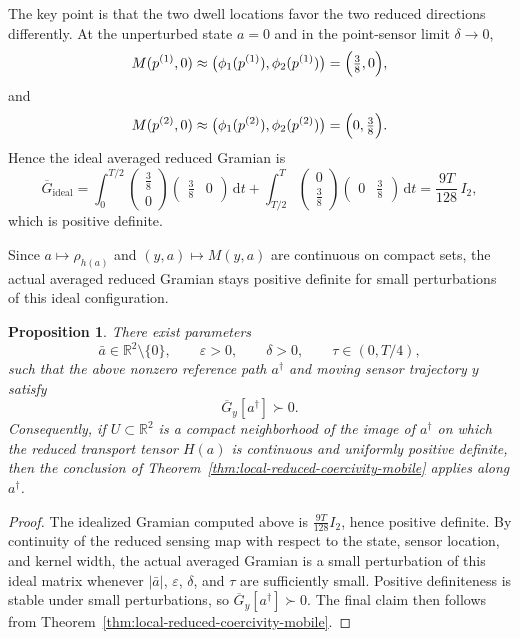 \documentclass{article}
\newtheorem{proposition}[theorem]{Proposition}
\theoremstyle{definition}
\renewcommand{\d}{\mathrm{d}}
\begin{document}
The key point is that the two dwell locations favor the two reduced directions differently.
At the unperturbed state \(a=0\) and in the point-sensor limit \(\delta\to 0\),
\[
    M(p^{(1)},0)\approx
    \bigl(\phi_1(p^{(1)}),\phi_2(p^{(1)})\bigr)
    =
    \Bigl(\tfrac38,0\Bigr),
\]
and
\[
    M(p^{(2)},0)\approx
    \bigl(\phi_1(p^{(2)}),\phi_2(p^{(2)})\bigr)
    =
    \Bigl(0,\tfrac38\Bigr).
\]
Hence the ideal averaged reduced Gramian is
\[
    \overline G_{\mathrm{ideal}}
    =
    \int_0^{T/2}
    \begin{pmatrix}\tfrac38\\[1mm]0\end{pmatrix}
    \begin{pmatrix}\tfrac38 & 0\end{pmatrix}\,\d t
    +
    \int_{T/2}^{T}
    \begin{pmatrix}0\\[1mm]\tfrac38\end{pmatrix}
    \begin{pmatrix}0 & \tfrac38\end{pmatrix}\,\d t
    =
    \frac{9T}{128}\,I_2,
\]
which is positive definite.

Since \(a\mapsto \rho_{h(a)}\) and \((y,a)\mapsto M(y,a)\) are continuous on compact sets, the
actual averaged reduced Gramian stays positive definite for small perturbations of this ideal
configuration.

\begin{proposition}
    \label{prop:2d-moving-sensor-example}
    There exist parameters
    \[
        \bar a\in\mathbb R^2\setminus\{0\},
        \qquad
        \varepsilon>0,
        \qquad
        \delta>0,
        \qquad
        \tau\in(0,T/4),
    \]
    such that the above nonzero reference path \(a^\dagger\) and moving sensor trajectory \(y\)
    satisfy
    \[
        \overline G_y[a^\dagger]\succ 0.
    \]
    Consequently, if \(U\subset\mathbb R^2\) is a compact neighborhood of the image of \(a^\dagger\)
    on which the reduced transport tensor \(H(a)\) is continuous and uniformly positive definite, then
    the conclusion of Theorem~\ref{thm:local-reduced-coercivity-mobile} applies along \(a^\dagger\).
\end{proposition}

\begin{proof}
    The idealized Gramian computed above is \(\frac{9T}{128}I_2\), hence positive definite.
    By continuity of the reduced sensing map with respect to the state, sensor location, and kernel
    width, the actual averaged Gramian is a small perturbation of this ideal matrix whenever
    \(|\bar a|\), \(\varepsilon\), \(\delta\), and \(\tau\) are sufficiently small. Positive definiteness is stable
    under small perturbations, so \(\overline G_y[a^\dagger]\succ 0\). The final claim then follows
    from Theorem~\ref{thm:local-reduced-coercivity-mobile}.
\end{proof}
\end{document}
